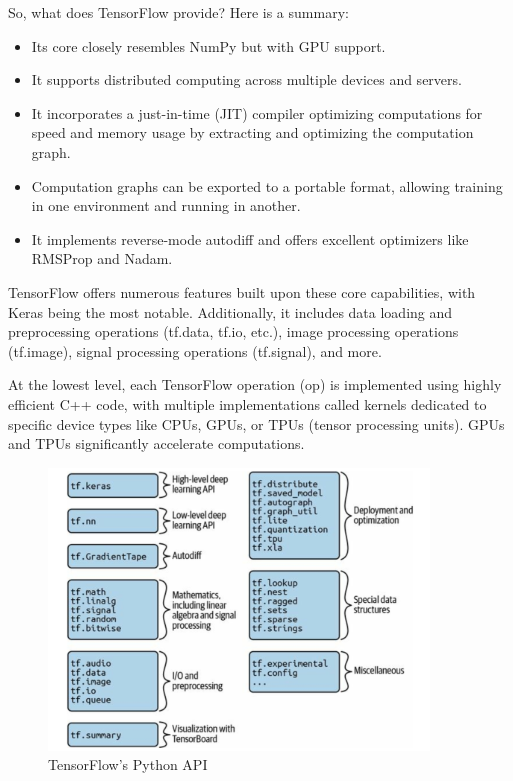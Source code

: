 So, what does TensorFlow provide? Here is a summary:

\begin{itemize}
	\item Its core closely resembles NumPy but with GPU support.
	\item It supports distributed computing across multiple devices and servers.
	\item It incorporates a just-in-time (JIT) compiler optimizing computations for speed and memory usage by extracting and optimizing the computation graph.
	\item Computation graphs can be exported to a portable format, allowing training in one environment and running in another.
	\item It implements reverse-mode autodiff and offers excellent optimizers like RMSProp and Nadam.
\end{itemize}

TensorFlow offers numerous features built upon these core capabilities, with Keras being the most notable. Additionally, it includes data loading and preprocessing operations (tf.data, tf.io, etc.), image processing operations (tf.image), signal processing operations (tf.signal), and more.

At the lowest level, each TensorFlow operation (op) is implemented using highly efficient C++ code, with multiple implementations called kernels dedicated to specific device types like CPUs, GPUs, or TPUs (tensor processing units). GPUs and TPUs significantly accelerate computations.

\begin{figure}[h!]
	\centering
	\includegraphics[width=0.9\textwidth]{Images/TensorFlow/tensorflowPythonAPI}
	\caption{TensorFlow’s Python API \cite{Geron:2022}} 
	\label{fig:tensorflowAPI}
\end{figure}



